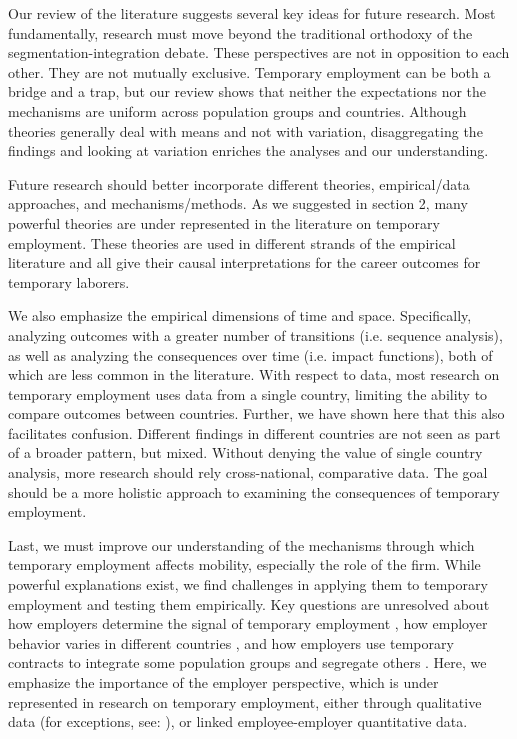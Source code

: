 \documentclass[12pt]{article}
\begin{document}
Our review of the literature suggests several key ideas for future research.  Most fundamentally, research must move beyond the traditional orthodoxy of the segmentation-integration debate.  These perspectives are not in opposition to each other.  They are not mutually exclusive.  Temporary employment can be both a bridge and a trap, but our review shows that neither the expectations nor the mechanisms are uniform across population groups and countries.  Although theories generally deal with means and not with variation, disaggregating the findings and looking at variation enriches the analyses and our understanding.  

Future research should better incorporate different theories, empirical/data approaches, and mechanisms/methods.   As we suggested in section 2, many powerful theories are under represented in the literature on temporary employment.  These theories are used in different strands of the empirical literature and all give their causal interpretations for the career outcomes for temporary laborers.  

We also emphasize the empirical dimensions of time and space.  Specifically, analyzing outcomes with a greater number of transitions (i.e. sequence analysis), as well as analyzing the consequences over time (i.e. impact functions), both of which are less common in the literature.  With respect to data, most research on temporary employment uses data from a single country, limiting the ability to compare outcomes between countries.  Further, we have shown here that this also facilitates confusion.  Different findings in different countries are not seen as part of a broader pattern, but mixed.  Without denying the value of single country analysis, more research should rely cross-national, comparative data.  The goal should be a more holistic approach to examining the consequences of temporary employment.  

Last, we must improve our understanding of the mechanisms through which temporary employment affects mobility, especially the role of the firm.  While powerful explanations exist, we find challenges in applying them to temporary employment and testing them empirically.  Key questions are unresolved about how employers determine the signal of temporary employment \citep{bills_etal_2017}, how employer behavior varies in different countries \citep{carre_tilly_2017}, and how employers use temporary contracts to integrate some population groups and segregate others \citep{pedulla_2020}.  Here, we emphasize the importance of the employer perspective, which is under represented in research on temporary employment, either through qualitative data (for exceptions, see: \citealp{rogers_1995,vosko_2000,casey_alach_2004,hatton_2011}), or linked employee-employer quantitative data.
\end{document}
